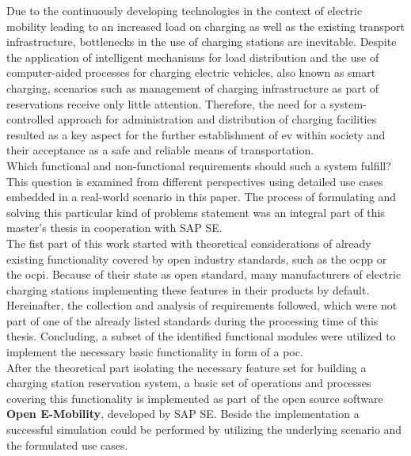 

\Abstract
Due to the continuously developing technologies in the context of electric mobility leading to an increased load on charging as well as the existing transport infrastructure, bottlenecks in the use of charging stations are inevitable.
Despite the application of intelligent mechanisms for load distribution and the use of computer-aided processes for charging electric vehicles, also known as smart charging, scenarios such as  management of charging infrastructure as part of reservations receive only little attention. 
Therefore, the need for a system-controlled approach for administration and distribution of charging facilities resulted as a key aspect for the further establishment of \acrfull{ev} within society and their acceptance as a safe and reliable means of transportation.\\
Which functional and non-functional requirements should such a system fulfill? This question is examined from different perspectives using detailed use cases embedded in a real-world scenario in this paper. 
The process of formulating and solving this particular kind of problems statement was an integral part of this master's thesis in cooperation with SAP SE.\\
The fist part of this work started with theoretical considerations of already existing functionality covered by open industry standards, such as the \acrfull{ocpp} or the \acrfull{ocpi}. Because of their state as open standard, many manufacturers of electric charging stations implementing these features in their products by default. Hereinafter, the collection and analysis of requirements followed, which were not part of one of the already listed standards during the processing time of this thesis. Concluding, a subset of the identified functional modules were utilized to implement the necessary basic functionality in form of a \acrshort{poc}.\\
After the theoretical part isolating the necessary feature set for building a charging station reservation system, a basic set of operations and processes covering this functionality is implemented as part of the open source software \textbf{Open E-Mobility}, developed by SAP SE. Beside the implementation a successful simulation could be performed by utilizing the underlying scenario and the formulated use cases. 
